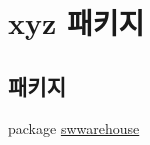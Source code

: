 \hypertarget{namespacexyz}{\section{xyz 패키지}
\label{namespacexyz}
}
\subsection*{패키지}
\begin{DoxyCompactItemize}
\item 
package \hyperlink{namespacexyz_1_1swwarehouse}{swwarehouse}
\end{DoxyCompactItemize}
